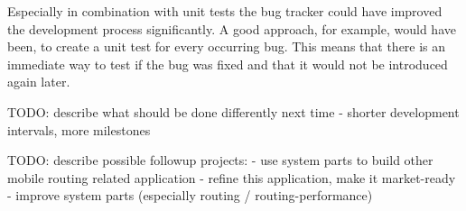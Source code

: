 Especially in combination with unit tests the bug tracker could have
improved the development process significantly. A good approach, for
example, would have been, to create a unit test for every occurring bug.
This means that there is an immediate way to test if the bug was
fixed and that it would not be introduced again later.


TODO: describe what should be done differently next time
- shorter development intervals, more milestones

TODO: describe possible followup projects:
- use system parts to build other mobile routing related application
- refine this application, make it market-ready
- improve system parts (especially routing / routing-performance)
